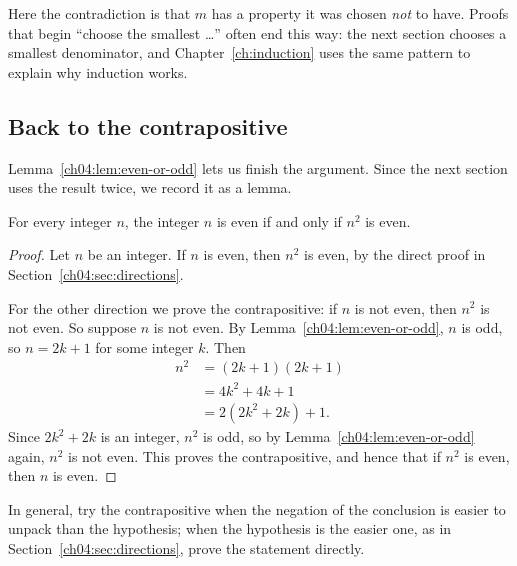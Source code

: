 Here the contradiction is that $m$ has a property it was chosen \emph{not} to have. Proofs that begin ``choose the smallest \ldots'' often end this way: the next section chooses a smallest denominator, and Chapter~\ref{ch:induction} uses the same pattern to explain why induction works.

\subsection*{Back to the contrapositive}
Lemma~\ref{ch04:lem:even-or-odd} lets us finish the argument. Since the next section uses the result twice, we record it as a lemma.

\par\noindent\begin{minipage}{\linewidth}
\begin{lemma}\label{thm:parity-square}
For every integer $n$, the integer $n$ is even if and only if $n^2$ is even.
\end{lemma}
\end{minipage}\par

\begin{proof}
Let $n$ be an integer. If $n$ is even, then $n^2$ is even, by the direct proof in Section~\ref{ch04:sec:directions}.

For the other direction we prove the contrapositive: if $n$ is not even, then $n^2$ is not even. So suppose $n$ is not even. By Lemma~\ref{ch04:lem:even-or-odd}, $n$ is odd, so $n=2k+1$ for some integer $k$. Then
\begin{align*}
n^2&=(2k+1)(2k+1)\\
&=4k^2+4k+1\\
&=2(2k^2+2k)+1.
\end{align*}
Since $2k^2+2k$ is an integer, $n^2$ is odd, so by Lemma~\ref{ch04:lem:even-or-odd} again, $n^2$ is not even. This proves the contrapositive, and hence that if $n^2$ is even, then $n$ is even.
\end{proof}

In general, try the contrapositive when the negation of the conclusion is easier to unpack than the hypothesis; when the hypothesis is the easier one, as in Section~\ref{ch04:sec:directions}, prove the statement directly.

